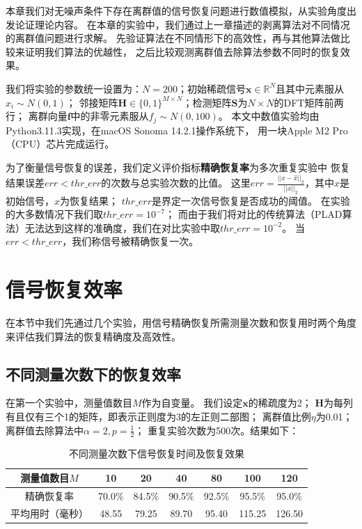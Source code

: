 \documentclass[AutoFakeBold]{LZUThesis}
\begin{document}
本章我们对无噪声条件下存在离群值的信号恢复问题进行数值模拟，从实验角度出发论证理论内容。
在本章的实验中，我们通过上一章描述的剥离算法对不同情况的离群值问题进行求解。
先验证算法在不同情形下的高效性，再与其他算法做比较来证明我们算法的优越性，
之后比较观测离群值去除算法参数不同时的恢复效果。

我们将实验的参数统一设置为：$N = 200$；初始稀疏信号$\mathbf{x} \in \mathbb{R}^N$且其中元素服从$x_i \sim N(0,1)$；
邻接矩阵$\mathbf{H} \in \{0, 1\}^{M \times N}$；检测矩阵$\mathbf{S}$为$N \times N$的DFT矩阵前两行；
离群向量$\mathbf{f}$中的非零元素服从$f_j \sim N(0,100)$。
本文中数值实验均由Python3.11.3实现，在macOS Sonoma 14.2.1操作系统下，
用一块Apple M2 Pro（CPU）芯片完成运行。

为了衡量信号恢复的误差，我们定义评价指标\textbf{精确恢复率}为多次重复实验中
恢复结果误差$err < thr\_err$的次数与总实验次数的比值。
这里$err = \frac{||x- \hat x||_2}{||x||_2}$，其中$x$是初始信号，$\hat x$为恢复结果；
$thr\_err$是界定一次信号恢复是否成功的阈值。
在实验的大多数情况下我们取$thr\_err = 10^{-7}$；
而由于我们将对比的传统算法（PLAD算法）无法达到这样的准确度，我们在对比实验中取$thr\_err = 10^{-2}$。
当$err < thr\_err$，我们称信号被精确恢复一次。


\section{信号恢复效率}

在本节中我们先通过几个实验，用信号精确恢复所需测量次数和恢复用时两个角度来评估我们算法的恢复精确度及高效性。

\subsection{不同测量次数下的恢复效率}
在第一个实验中，测量值数目$M$作为自变量。
我们设定$\mathbf{x}$的稀疏度为2；
$\mathbf{H}$为每列有且仅有三个1的矩阵，即表示正则度为3的左正则二部图；
离群值比例$\eta$为0.01；
离群值去除算法中$\alpha = 2, p = \frac{1}{2}$；
重复实验次数为500次。结果如下：

\begin{table}[H]
    \centering
    \caption{不同测量次数下信号恢复时间及恢复效果}
    \begin{tabular}{ccccccc} %
        \toprule
        测量值数目$M$ & 10  & 20  & 40  & 80 & 100 & 120 \\
        \toprule
        精确恢复率 & 70.0\% & 84.5\% & 90.5\%  & 92.5\% & 95.5\% & 95.0\% \\
        \midrule
        平均用时（毫秒） & 48.55 & 79.25 & 89.70 & 95.40 & 115.25 & 126.50 \\
        \bottomrule
    \end{tabular}
    \label{effeciency}
\end{table}
\end{document}
